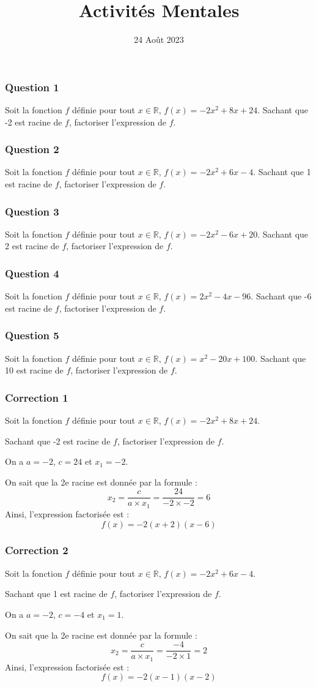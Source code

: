 \documentclass[15pt, mathserif]{beamer}
\title{Activités Mentales}
\date{24 Août 2023}
\newcommand{\R}{\mathbb{R}}			%
\begin{document}
\begin{frame}
    \titlepage
\end{frame}

\begin{frame} 
	\frametitle{Question 1}
Soit la fonction $f$ définie pour tout $x \in \R$, $f(x)=-2x^2+8x+24$. Sachant que -2 est racine de $f$, factoriser l'expression de $f$.\end{frame}


\begin{frame} 
	\frametitle{Question 2}
Soit la fonction $f$ définie pour tout $x \in \R$, $f(x)=-2x^2+6x-4$. Sachant que 1 est racine de $f$, factoriser l'expression de $f$.\end{frame}


\begin{frame} 
	\frametitle{Question 3}
Soit la fonction $f$ définie pour tout $x \in \R$, $f(x)=-2x^2-6x+20$. Sachant que 2 est racine de $f$, factoriser l'expression de $f$.\end{frame}


\begin{frame} 
	\frametitle{Question 4}
Soit la fonction $f$ définie pour tout $x \in \R$, $f(x)=2x^2-4x-96$. Sachant que -6 est racine de $f$, factoriser l'expression de $f$.\end{frame}


\begin{frame} 
	\frametitle{Question 5}
Soit la fonction $f$ définie pour tout $x \in \R$, $f(x)=x^2-20x+100$. Sachant que 10 est racine de $f$, factoriser l'expression de $f$.\end{frame}


\begin{frame}
\vspace{-10mm}
	\frametitle{Correction 1}
Soit la fonction $f$ définie pour tout $x \in \R$, $f(x)=-2x^2+8x+24$. 
 
 Sachant que -2 est racine de $f$, factoriser l'expression de $f$. 
 
 On a $a=-2$, $c=24$ et $x_1=-2$. 
 
 On sait que la 2e racine est donnée par la formule : $$x_2=\dfrac{c}{a \times x_1}=\dfrac{24}{-2\times -2}=6$$ Ainsi, l'expression factorisée est : $$f(x)=-2(x+2)(x-6)$$ 
 \end{frame}


\begin{frame}
\vspace{-10mm}
	\frametitle{Correction 2}
Soit la fonction $f$ définie pour tout $x \in \R$, $f(x)=-2x^2+6x-4$. 
 
 Sachant que 1 est racine de $f$, factoriser l'expression de $f$. 
 
 On a $a=-2$, $c=-4$ et $x_1=1$. 
 
 On sait que la 2e racine est donnée par la formule : $$x_2=\dfrac{c}{a \times x_1}=\dfrac{-4}{-2\times 1}=2$$ Ainsi, l'expression factorisée est : $$f(x)=-2(x-1)(x-2)$$ 
 \end{frame}
\end{document}
